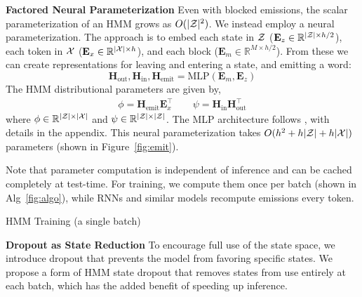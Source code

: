 \documentclass[11pt,a4paper]{article}
\begin{document}
\vspace{0.2cm}

\noindent
\textbf{Factored Neural Parameterization}
Even with blocked emissions, the scalar parameterization of an HMM grows as $O(|\mathcal{Z}|^2)$.
We instead employ a neural parameterization.
The approach is to embed each state in $\mathcal{Z}$ ($\mathbf{E}_z \in \mathbb{R}^{|\mathcal{Z}| \times h/2}$),
each token in $\cal X$ ($\mathbf{E}_x \in \mathbb{R}^{|\mathcal{X}| \times h}$),
and each block ($\mathbf{E}_m \in \mathbb{R}^{M \times h/2}$).
From these we can create representations for leaving and entering a state,
and emitting a word: 
\[ \mathbf{H}_{\textrm{out}},\mathbf{H}_{\textrm{in}},\mathbf{H}_\textrm{emit}
 = \text{MLP}(\mathbf{E}_m, \mathbf{E}_z ) \] 
The HMM distributional parameters are given by,
\begin{equation}
\begin{aligned}
\phi = \mathbf{H}_\textrm{emit}\mathbf{E}_x ^\top \qquad 
\psi = \mathbf{H}_\textrm{in}\mathbf{H}_\textrm{out}^\top
\end{aligned}
\end{equation}
where $\phi \in \mathbb{R}^{|\mathcal{Z}|\times|\mathcal{X}|}$ and
$\psi \in \mathbb{R}^{|\mathcal{Z}|\times|\mathcal{Z}|}$.
The MLP architecture follows \cite{kim2019cpcfg}, with details in the appendix.
This neural parameterization takes $O(h^2 + h|\mathcal{Z}| + h|\mathcal{X}|)$ parameters
(shown in Figure~\ref{fig:emit}).

Note that parameter computation is independent of inference
and can be cached completely at test-time.
For training, we compute them once per batch (shown in Alg~\ref{fig:algo}),
while RNNs and similar models recompute emissions every token.


\begin{algorithm}[t]
\begin{algorithmic}
    \EndFor
\end{algorithmic}
\caption{
\label{fig:algo}
HMM Training (a single batch)
}
\end{algorithm}

\vspace{0.2cm}

\noindent
\textbf{Dropout as State Reduction}
To encourage full use of the state space,
we introduce dropout that prevents the model from favoring specific states. 
We propose a form of HMM state dropout that removes states from use entirely
at each batch,
which has the added benefit of speeding up inference.
\end{document}
